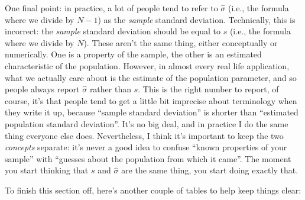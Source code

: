 \documentclass[
]{book}
\begin{document}
One final point: in practice, a lot of people tend to refer to \(\hat{\sigma}\) (i.e., the formula where we divide by \(N-1\)) as the \emph{sample} standard deviation. Technically, this is incorrect: the \emph{sample} standard deviation should be equal to \(s\) (i.e., the formula where we divide by \(N\)). These aren't the same thing, either conceptually or numerically. One is a property of the sample, the other is an estimated characteristic of the population. However, in almost every real life application, what we actually care about is the estimate of the population parameter, and so people always report \(\hat\sigma\) rather than \(s\). This is the right number to report, of course, it's that people tend to get a little bit imprecise about terminology when they write it up, because ``sample standard deviation'' is shorter than ``estimated population standard deviation''. It's no big deal, and in practice I do the same thing everyone else does. Nevertheless, I think it's important to keep the two \emph{concepts} separate: it's never a good idea to confuse ``known properties of your sample'' with ``guesses about the population from which it came''. The moment you start thinking that \(s\) and \(\hat\sigma\) are the same thing, you start doing exactly that.

To finish this section off, here's another couple of tables to help keep things clear:
\end{document}
